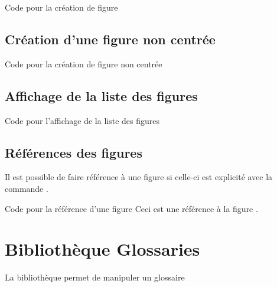 {
\begin{Latex}{Code pour la création de figure}
\end{Latex}



\section{Création d'une figure non centrée}


\begin{Latex}{Code pour la création de figure non centrée}
\end{Latex}

\section{Affichage de la liste des figures}

\begin{Latex}{Code pour l'affichage de la liste des figures}
\end{Latex}



\section{Références des figures}

Il est possible de faire référence à une figure si celle-ci est explicité avec la commande .\\


\begin{Latex}{Code pour la référence d'une figure}
  Ceci est une référence à la figure .
\end{Latex}

\chapter{Bibliothèque Glossaries}
\label{addDef}
La bibliothèque  permet de manipuler un glossaire


}
